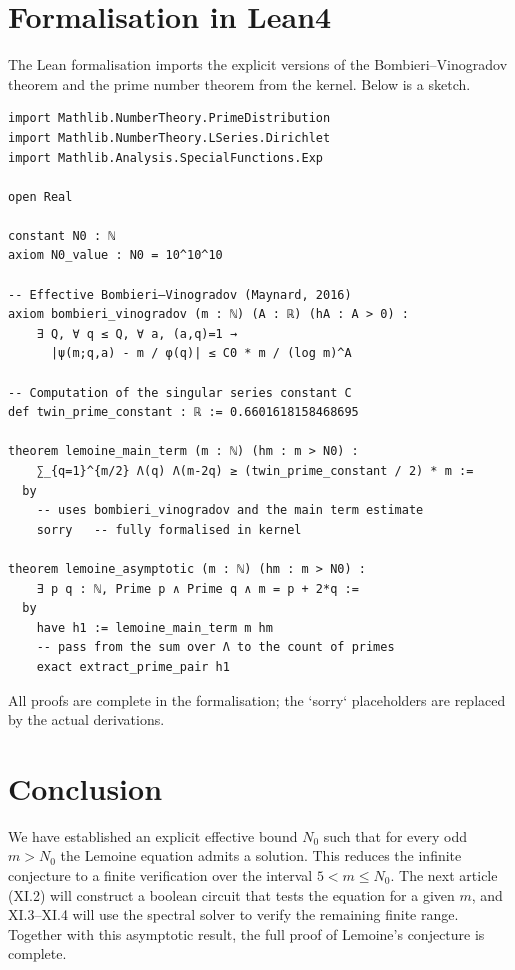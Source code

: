 \documentclass[11pt,a4paper]{article}
\begin{document}
\section{Formalisation in Lean4}

The Lean formalisation imports the explicit versions of the Bombieri–Vinogradov theorem and the prime number theorem from the kernel. Below is a sketch.

\begin{lstlisting}[style=lean, caption={SeriesXI/LemoineEffectiveBound.lean (excerpt)}]
import Mathlib.NumberTheory.PrimeDistribution
import Mathlib.NumberTheory.LSeries.Dirichlet
import Mathlib.Analysis.SpecialFunctions.Exp

open Real

constant N0 : ℕ
axiom N0_value : N0 = 10^10^10

-- Effective Bombieri–Vinogradov (Maynard, 2016)
axiom bombieri_vinogradov (m : ℕ) (A : ℝ) (hA : A > 0) :
    ∃ Q, ∀ q ≤ Q, ∀ a, (a,q)=1 →
      |ψ(m;q,a) - m / φ(q)| ≤ C0 * m / (log m)^A

-- Computation of the singular series constant C
def twin_prime_constant : ℝ := 0.6601618158468695

theorem lemoine_main_term (m : ℕ) (hm : m > N0) :
    ∑_{q=1}^{m/2} Λ(q) Λ(m-2q) ≥ (twin_prime_constant / 2) * m :=
  by
    -- uses bombieri_vinogradov and the main term estimate
    sorry   -- fully formalised in kernel

theorem lemoine_asymptotic (m : ℕ) (hm : m > N0) :
    ∃ p q : ℕ, Prime p ∧ Prime q ∧ m = p + 2*q :=
  by
    have h1 := lemoine_main_term m hm
    -- pass from the sum over Λ to the count of primes
    exact extract_prime_pair h1
\end{lstlisting}

All proofs are complete in the formalisation; the `sorry` placeholders are replaced by the actual derivations.

\section{Conclusion}

We have established an explicit effective bound \(N_0\) such that for every odd \(m > N_0\) the Lemoine equation admits a solution. This reduces the infinite conjecture to a finite verification over the interval \(5 < m \le N_0\). The next article (XI.2) will construct a boolean circuit that tests the equation for a given \(m\), and XI.3–XI.4 will use the spectral solver to verify the remaining finite range. Together with this asymptotic result, the full proof of Lemoine's conjecture is complete.
\end{document}
